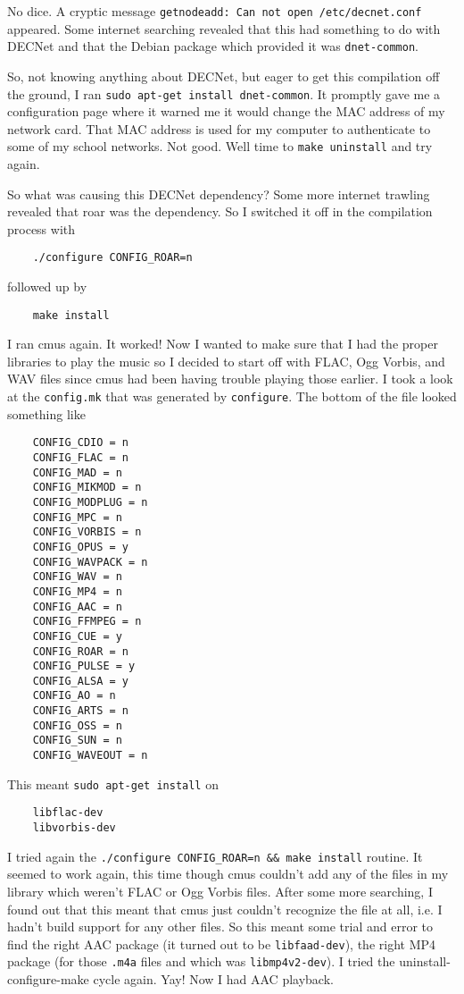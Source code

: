\documentclass[12pt]{article}
\begin{document}
No dice.
A cryptic message \lstinline$getnodeadd: Can not open /etc/decnet.conf$ appeared.
Some internet searching revealed that this had something to do with DECNet and that the Debian package which provided it was \lstinline$dnet-common$.

So, not knowing anything about DECNet, but eager to get this compilation off the ground, I ran \lstinline$sudo apt-get install dnet-common$.
It promptly gave me a configuration page where it warned me it would change the MAC address of my network card.
That MAC address is used for my computer to authenticate to some of my school networks.
Not good.
Well time to \lstinline$make uninstall$ and try again.

So what was causing this DECNet dependency?
Some more internet trawling revealed that roar was the dependency.
So I switched it off in the compilation process with 
\begin{lstlisting}
	./configure CONFIG_ROAR=n
\end{lstlisting}
followed up by 
\begin{lstlisting}
	make install
\end{lstlisting}

I ran cmus again.
It worked!
Now I wanted to make sure that I had the proper libraries to play the music so I decided to start off with FLAC, Ogg Vorbis, and WAV files since cmus had been having trouble playing those earlier.
I took a look at the \lstinline$config.mk$ that was generated by \lstinline$configure$.
The bottom of the file looked something like
\begin{lstlisting}
	CONFIG_CDIO = n
	CONFIG_FLAC = n
	CONFIG_MAD = n
	CONFIG_MIKMOD = n
	CONFIG_MODPLUG = n
	CONFIG_MPC = n
	CONFIG_VORBIS = n
	CONFIG_OPUS = y
	CONFIG_WAVPACK = n
	CONFIG_WAV = n
	CONFIG_MP4 = n
	CONFIG_AAC = n
	CONFIG_FFMPEG = n
	CONFIG_CUE = y
	CONFIG_ROAR = n
	CONFIG_PULSE = y
	CONFIG_ALSA = y
	CONFIG_AO = n
	CONFIG_ARTS = n
	CONFIG_OSS = n
	CONFIG_SUN = n
	CONFIG_WAVEOUT = n
\end{lstlisting}
This meant \lstinline$sudo apt-get install$ on
\begin{lstlisting}
	libflac-dev
	libvorbis-dev
\end{lstlisting}

I tried again the \lstinline$./configure CONFIG_ROAR=n && make install$ routine.
It seemed to work again, this time though cmus couldn't add any of the files in my library which weren't FLAC or Ogg Vorbis files.
After some more searching, I found out that this meant that cmus just couldn't recognize the file at all, i.e. I hadn't build support for any other files.
So this meant some trial and error to find the right AAC package (it turned out to be \lstinline$libfaad-dev$), the right MP4 package (for those \lstinline$.m4a$ files and which was \lstinline$libmp4v2-dev$).
I tried the uninstall-configure-make cycle again.
Yay! Now I had AAC playback.
\end{document}
